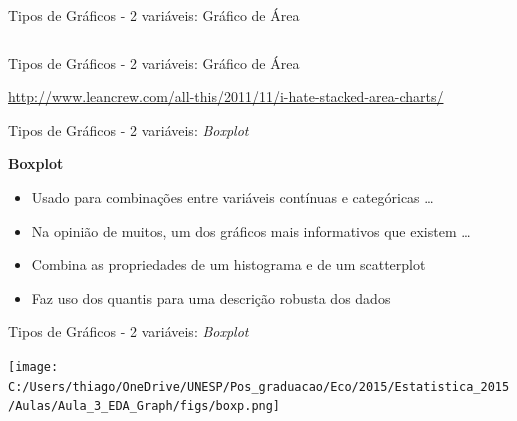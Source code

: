 \documentclass{beamer}\usepackage[]{graphicx}\usepackage[]{color}
\newenvironment{knitrout}{}{} %
\renewenvironment{knitrout}{\setlength{\topsep}{0mm}}{}
\begin{document}
\begin{frame}[fragile]{Tipos de Gráficos - 2 variáveis: Gráfico de Área}
\begin{columns}[t]
\begin{knitrout}
\end{knitrout}

\end{columns}

\end{frame}



\begin{frame}[fragile]{Tipos de Gráficos - 2 variáveis: Gráfico de Área}

\url{http://www.leancrew.com/all-this/2011/11/i-hate-stacked-area-charts/}

\end{frame}


\begin{frame}{Tipos de Gráficos - 2 variáveis: \emph{Boxplot}}

\textbf{Boxplot}

\begin{itemize}
  \item Usado para combinações entre variáveis contínuas e categóricas \ldots \pause
  \vfill
  \item Na opinião de muitos, um dos gráficos mais informativos que existem \ldots \pause
  \vfill
  \item Combina as propriedades de um histograma e de um scatterplot \pause
  \vfill
  \item Faz uso dos quantis para uma descrição robusta dos dados 
\end{itemize}

\end{frame} 



\begin{frame}[fragile]{Tipos de Gráficos - 2 variáveis: \emph{Boxplot}}

\centering
\texttt{[image: C:/Users/thiago/OneDrive/UNESP/Pos\_graduacao/Eco/2015/Estatistica\_2015/Aulas/Aula\_3\_EDA\_Graph/figs/boxp.png]}

\end{frame}
\end{document}
